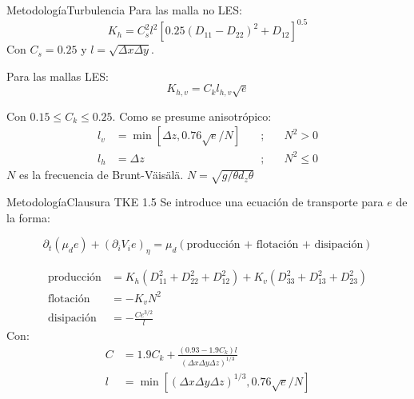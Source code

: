 \documentclass[mathserif]{beamer}
\begin{document}
\begin{frame}{Metodología}{Turbulencia}
Para las malla no LES:
\begin{equation}
K_h = C_s^2 l^2[0.25(D_{11}-D_{22})^2+D_{12}]^{0.5}
\end{equation}
Con $C_s=0.25$ y $l=\sqrt{\Delta x\Delta y}$.

\bigskip
Para las mallas LES:
\begin{equation}
K_{h,v} = C_k l_{h,v}\sqrt{e}
\end{equation}

Con $0.15\leq C_k \leq 0.25$. Como se presume anisotrópico:
\begin{align}
l_v &= \min[\Delta z, 0.76\sqrt{e}/N]\quad&;&\quad N^2>0\\
l_h &= \Delta z\quad&;&\quad N^2\leq 0
\end{align}
$N$ es la frecuencia de Brunt-Väisälä. $N=\sqrt{g/\theta d_z\theta}$
\end{frame}

\begin{frame}{Metodología}{Clausura TKE 1.5}
	Se introduce una ecuación de transporte para $e$ de la forma:
	\bigskip
	
	{\footnotesize
	\begin{equation}
	\partial_t(\mu_d e) + (\partial_i V_i e)_\eta = \mu_d(\text{producción + flotación + disipación})
	\end{equation}}

{\small
	\begin{align}
	\text{producción}&= K_h (D_{11}^2 + D_{22}^2 + D_{12}^2) + K_v (D_{33}^2 + D_{13}^2 + D_{23}^2)\\
	\text{flotación}&=-K_v N^2\\
	\text{disipación}&=-\frac{C e^{3/2}}{l}
	\end{align}}
Con:
{\small
\begin{align}
C &= 1.9C_k + \frac{(0.93 - 1.9 C_k)l}{(\Delta x \Delta y \Delta z)^{1/3}}\\
l &= \min[(\Delta x \Delta y \Delta z)^{1/3}, 0.76\sqrt{e}/N]
\end{align}}
\end{frame}
\end{document}
